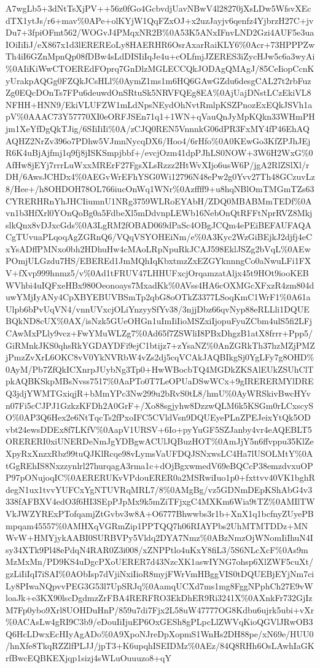 \documentclass[]{article}
\begin{document}
A7wgLb5+3dNtTsXjPV++56z0fGo4GcbvdjUavNBwV4l28270jXsLDw5WfsvXEcdTX1ytJs/r6+mav\%0APe+olKYjW1QqFZxOJ+x2uzJayjv6qenfz4YjbrzH27C+jvDu7+3fpiOFmt562/WOGvJ4PMqxNR2B\%0A53K5ANxIFnvLND2Gzi4AUF5e3uaIOiIiIiJ/eX867x1d3lEREREoLy8HAERHR6OsrAxarRaiKLY6\%0Acr+73HPPPZwTh4iI6GZnMpnQp08fDBw4sLdDISIiIqJe4u+cOLfmjJZERES3iZycHJw5c6a3wyAi\%0AIiKiWwCTOEREdFOprq7GnDlzMGLECCQkJODAgQMAgJ/85CeIiopCcnKyUrakpAQGg0FZQkJCsHLl\%0AymZ1ms1m6HQ6GAwGZdu6desgCAL27t2rbFuzZg0EQcDOnTs7FPu6deuwdOnSRtuSk5NRVFQEg8EA\%0AjUajDNstLCzEkiVL8NFHH+HNN9/EkiVLUFZW1mLdNpsNEydOhNvtRmlpKSZPnozExEQkJSVh1apV\%0AAAC73Y57770XI0eORFJSEn71q1+1WN+qVauQnJyMpKQkn33WHmPHjm1XeYfDgQkTJig/6SIiIiIi\%0A/zCJQ0REN5VnnnkG06dPR3FxMY4fP46EhAQAQHZ2NrZv396o7PDhw5VJmnNycqDX6/Hoo4/6rHfo\%0A0KEwGo3KfZPJhJEjR6K4uBjAjfmj1q9fj8jISKSmpjbbf+/evcjOzm41dpPJhLS0NOW+3W6H2WxG\%0AfHw8jEYj7rrrLuWxxMRErF27FgsXLsRzzz2HtWvXIjo6usW6P/jgA2RlZSlXl/rDH/6AwsJCHDx4\%0AEGvWrEFhYSG0Wi12796N48ePw2g0Yvv27Th48GCzuvLz8/Hee+/h8OHDOH78OL766iucOnWq1WNr\%0Azffff9+u8hqNBlOmTMGmTZs63CYRERHRnYhJHCIiumnU1NRg3759WLRoEYAbH/ZDQ0MBABMmTEDf\%0Avn1b3HfXrl0YOnQoBg0a5FdbeXl5mDdvnpLEWb16NebOnQtRFFtNprRVZ8MkjslkQnx8vDJxcGds\%0A3LgRM2fOBAD069dPaSc4OBgJCQm4ePEiBEFAUFAQACgTUvuaPLqoqAgZGRnQ6/VQqVSYOHEiNm/e\%0A3Kyc2WzGiBEjkJ2djfj4eCxYsADffPMNxo0bh2HDhuHw4cMAoLRpNpuRkJCAJ598EklJSZg2bVqL\%0AEwPOmjULGzdu7HS/EBEREd1JmMQhIqKbxtmzZxEZGYknnngCo0aNwuLFi1FXV+fXvp999hnmz5/v\%0Ad1tFRUV47LHHUFxcjOrqamzatAljx45t9HOt9iooKEBWVhbi4uIQFxeHBx980Oeonoays7MxadKk\%0AVss4HA6cOXMGcXFxzR4zm804duwYMjIyANy4CpXBYEBUVBSmTp2qbG8oOTkZ3377LSoqKmC1WrF1\%0A61aUlpb6bPvUqVN4/vnnUVxcjOLiYnzyySfYv38/3njjDbz66qvNyp88eRLLli1DQUEBQkND8cUX\%0AX/isNzk5GUeOHGn1uImIiIioMSZxiIjopuFyuZCbm4ulS5fi2LFjCAwMxPLly9vcz+FwYMuWLZg7\%0Ad65f7ZSWliI8PBxDhgzB1atX8frrr+Ppp5/GiRMnkJKS0qhsRkYGDAYDFi9ejC1btijz7+zYsaNZ\%0AnZGRkTh37hzMZjPMZjPmzZvXrL6OKC8vV0YkNVRbW4vZs2dj5cqVCAkJAQBIkgSj0YgLFy7g8OHD\%0AyM/Pb7ZfQkICXnrpJUybNg3Tp0+HwWBocbTQ4MGDkZKSAlEUkZSUhClTpkAQBKSkpMBsNvss7517\%0AaPTo0T7LeOPUaDSwWCx+9gIRERERMYlDREQ3jdjYWMTGxiqjR+bMmYPc3Nw299u2bRvS0tL8/hmU\%0AyWRSkivBwcHYvn07Fi5cCJPJ1GzkzKFDh2A0GrF+/Xo88sgjyhw8DzzwQLM6k5KSGm0rLCxscySO\%0AP3Q6Hex2e6NtTqcTs2fPxoIFC5CVldVsn9DQUEyePLnZPEJeixYtQk5ODvbt24ewsDDEx8f7LKfV\%0AapV1URSV+6Io+pyYuGF5SZJanby4vr4eAQEBLT5ORERERI0xiUNERDeNmJgYDBgwACUlJQBuzHOT\%0AmJjY5n6ffvppu35KlZeXpyRxXnzxRbz99tuQJKlRcqe98vLymsVaUFDQJSNxwsLC4Ha7lUSOLMtY\%0AtGgREhIS8Nxzzynlrl27hurqagA3rma1c+dOjBgxwmedV69eBQCcP38emzdvxuOPP97pONujoqIC\%0AERERUKvVPdouERER0a2MSRwiIuo1p0+fxttvv40VK1bghRdegN1ux1tvvYUFCxYgNTUVRqMRL7/8\%0AMgBg/vz5GDNmDEpKShAbG4v3338fAFBXV4edO3f6HI3SEpPJpMx9k5mZiTFjxgC4MXKm6Wia9tTZ\%0AMIlTWVkJWZYRExPTofqamjZtGvbv3w8A+O6777Bhwwbs3r1b+XnX1q1bcfnyZUyePBmpqam45557\%0AMHXqVGRmZip1PPTQQ7h06RIAYPbs2UhMTMTDDz+MNWvW+HMYjykAABI0SURBVPy5Vldq2DYA7Nmz\%0ABzNmzOjWNomIiIhuN4Isy34XTk9Pl48ePdqN4RAR0Z3i008/xZNPPtlo4uKxY8fiL3/5S6NLcXcF\%0As9mMzMxMn/PD9KS4uDgcPXoUERER7d43NzcXK1aswIYNG7ohsp6XlZWF5cuXt/gzLiIiIqI7iSAI\%0AObIsp7dVjiNxiIioR8myjFWrVmHBggVIS0tDQUEBjEYjNm7ciLy8PIwaNQpvvPEG3G53l7UpSRJq\%0AamqUCXd7ms1mg8FggNPphCh27E9vWloaJk+e3KX90lscDgdmzZrFBA4RERFRO3EkDhER9Ri3241X\%0AXnkFr732GjIzM7Fp0ybo9Xrl8UOHDuHnP/859u7di7Fjx2L58uW47777OG8Kdbu6ujrk5ubi+vXr\%0ACAsLw4gRI9C3b9/eDouIiIjuEP6OxGESh8gPLpcLlZWVqKioQGVlJRwOB3Q6HcLDwxEcHIyAgADo\%0A9XpoNJreDpXopmS1WnHs2DH88pe/xN69e/HUU0/hnXfe8TkqRZZlfPLJJ/jpT3+K6upqhISEIDMz\%0AEz/84Q8RHh6OsLAwhIaGKrfBwcEQBKEXjqp1sizj4sWLuOuuuzo8+qY
\end{document}
